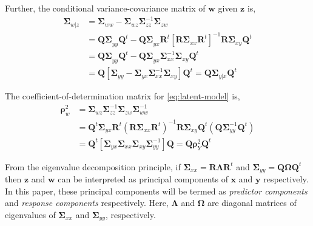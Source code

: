 \documentclass[review]{elsarticle}
\providecommand{\tightlist}{%
  \setlength{\itemsep}{0pt}\setlength{\parskip}{0pt}}
\theoremstyle{definition}
\theoremstyle{definition}
\theoremstyle{definition}
\theoremstyle{remark}
\begin{document}
\begin{description}
\tightlist
\item[Conditional Variance]
Further, the conditional variance-covariance matrix of \(\mathbf{w}\)
given \(\mathbf{z}\) is, \[
  \begin{aligned}
\boldsymbol{\Sigma}_{w|z}
&= \boldsymbol{\Sigma}_{ww} - \boldsymbol{\Sigma}_{wz}\boldsymbol{\Sigma}_{zz}^{-1}\boldsymbol{\Sigma}_{zw} \\
&= \boldsymbol{Q\Sigma}_{yy}\mathbf{Q}^t -
  \boldsymbol{Q \Sigma}_{yx}\mathbf{R}^t \left[\boldsymbol{R\Sigma}_{xx}\boldsymbol{R}^t\right]^{-1}
  \boldsymbol{R\Sigma}_{xy}\mathbf{Q}^t \nonumber \\
&= \boldsymbol{Q\Sigma}_{yy}\mathbf{Q}^t -
  \boldsymbol{Q \Sigma}_{yx}\boldsymbol{\Sigma}_{xx}^{-1}\boldsymbol{\Sigma}_{xy}\mathbf{Q}^t \\
&= \mathbf{Q}\left[\boldsymbol{\Sigma}_{yy} -
  \boldsymbol{\Sigma}_{yx}\boldsymbol{\Sigma}_{xx}^{-1}\boldsymbol{\Sigma}_{xy}\right]\mathbf{Q}^{t}
= \mathbf{Q} \boldsymbol{\Sigma}_{y|x}\mathbf{Q}^t
  \end{aligned}
  \]
\item[Coefficient of Determination]
The coefficient-of-determination matrix for \eqref{eq:latent-model} is, \[
  \begin{aligned}
\boldsymbol{\rho}^2_w &= \boldsymbol{\Sigma}_{wz}
\boldsymbol{\Sigma}_{zz}^{-1} \boldsymbol{\Sigma}_{zw}
\boldsymbol{\Sigma}_{ww}^{-1} \\
  &=\mathbf{Q}^t
  \boldsymbol{\Sigma}_{yx}\mathbf{R}^t \left(\mathbf{R}\boldsymbol{\Sigma}_{xx}\mathbf{R}^t\right)^{-1}
  \mathbf{R}\boldsymbol{\Sigma}_{xy}\mathbf{Q}^t \left(\mathbf{Q} \boldsymbol{\Sigma}_{yy}^{-1} \mathbf{Q}^t\right) \nonumber \\
  &=\mathbf{Q}^t\left[\boldsymbol{\Sigma}_{yx}\boldsymbol{\Sigma}_{xx}\boldsymbol{\Sigma}_{xy}\boldsymbol{\Sigma}_{yy}^{-1}\right]\mathbf{Q}
  = \mathbf{Q}\boldsymbol{\rho}_{Y}^2 \mathbf{Q}^t
  \end{aligned}
  \]
\end{description}

From the eigenvalue decomposition principle, if
\(\boldsymbol{\Sigma}_{xx} = \mathbf{R}\boldsymbol{\Lambda}\mathbf{R}^t\)
and
\(\boldsymbol{\Sigma}_{yy} = \mathbf{Q}\boldsymbol{\Omega}\mathbf{Q}^t\)
then \(\mathbf{z}\) and \(\mathbf{w}\) can be interpreted as principal
components of \(\mathbf{x}\) and \(\mathbf{y}\) respectively. In this
paper, these principal components will be termed as \emph{predictor
components} and \emph{response components} respectively. Here,
\(\boldsymbol{\Lambda}\) and \(\boldsymbol{\Omega}\) are diagonal
matrices of eigenvalues of \(\boldsymbol{\Sigma}_{xx}\) and
\(\boldsymbol{\Sigma}_{yy}\), respectively.
\end{document}
